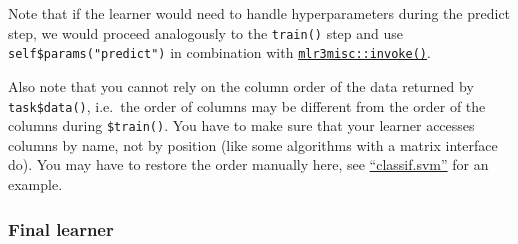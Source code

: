 \documentclass[]{article}
\newenvironment{Shaded}{\begin{snugshade}}{\end{snugshade}}
\newcommand{\ControlFlowTok}[1]{\textcolor[rgb]{0.13,0.29,0.53}{\textbf{#1}}}
\newcommand{\DataTypeTok}[1]{\textcolor[rgb]{0.13,0.29,0.53}{#1}}
\newcommand{\KeywordTok}[1]{\textcolor[rgb]{0.13,0.29,0.53}{\textbf{#1}}}
\newcommand{\NormalTok}[1]{#1}
\newcommand{\OperatorTok}[1]{\textcolor[rgb]{0.81,0.36,0.00}{\textbf{#1}}}
\newcommand{\OtherTok}[1]{\textcolor[rgb]{0.56,0.35,0.01}{#1}}
\newcommand{\StringTok}[1]{\textcolor[rgb]{0.31,0.60,0.02}{#1}}
\renewenvironment{Shaded} {\begin{snugshade}\small} {\end{snugshade}}
\begin{document}
\begin{Shaded}
\end{Shaded}

Note that if the learner would need to handle hyperparameters during the predict step, we would proceed analogously to the \texttt{train()} step and use \texttt{self\$params("predict")} in combination with \href{https://mlr3misc.mlr-org.com/reference/invoke.html}{\texttt{mlr3misc::invoke()}}.

Also note that you cannot rely on the column order of the data returned by \texttt{task\$data()}, i.e.~the order of columns may be different from the order of the columns during \texttt{\$train()}.
You have to make sure that your learner accesses columns by name, not by position (like some algorithms with a matrix interface do).
You may have to restore the order manually here, see \href{https://github.com/mlr-org/mlr3learners/blob/master/R/LearnerClassifSVM.R}{``classif.svm''} for an example.

\hypertarget{final-learner}{%
\subsubsection{Final learner}\label{final-learner}}
\end{document}
